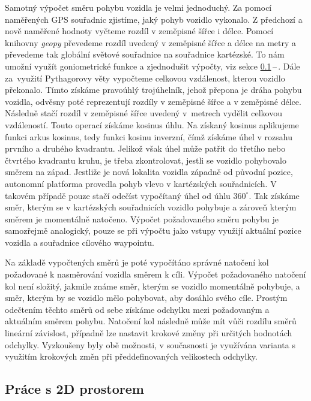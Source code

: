 \documentclass[czech, bachelor]{diploma}
\newcommand{\peteref}[1]{\ref{#1}\,--\,\nameref{#1}}
\begin{document}
Samotný výpočet směru pohybu vozidla je velmi jednoduchý. Za pomocí naměřených GPS souřadnic zjistíme, jaký pohyb vozidlo
vykonalo. Z předchozí a nově naměřené hodnoty vyčteme rozdíl v zeměpisné šířce i délce. Pomocí knihovny \emph{geopy} převedeme
rozdíl uvedený v zeměpisné šířce a délce na metry a převedeme tak globální světové souřadnice na souřadnice kartézské. To nám
umožní využít goniometrické funkce a zjednodušit výpočty, viz sekce \peteref{cartesian-coordinates}. Dále za~využití Pythagorovy
věty vypočteme celkovou vzdálenost, kterou vozidlo překonalo. Tímto získáme pravoúhlý trojúhelník, jehož přepona je dráha
pohybu vozidla, odvěsny poté reprezentují rozdíly v zeměpisné šířce a v zeměpisné délce. Následně stačí rozdíl v zeměpisné šířce
uvedený v~metrech vydělit celkovou vzdáleností. Touto operací získáme kosinus úhlu. Na získaný kosinus aplikujeme funkci arkus
kosinus, tedy funkci kosinu inverzní, čímž získáme úhel v rozsahu prvního a druhého kvadrantu. Jelikož však úhel může patřit do
třetího nebo čtvrtého kvadrantu kruhu, je třeba zkontrolovat, jestli se vozidlo pohybovalo směrem na západ. Jestliže je nová
lokalita vozidla západně od původní pozice, autonomní platforma provedla pohyb vlevo v kartézských souřadnicích. V takovém případě
pouze stačí odečíst vypočítaný úhel od úhlu $360^{\circ}$. Tak získáme směr, kterým se v kartézských souřadnicích vozidlo pohybuje
a zároveň kterým směrem je momentálně natočeno. Výpočet požadovaného směru pohybu je samozřejmě analogický, pouze se při výpočtu
jako vstupy využijí aktuální pozice vozidla a souřadnice cílového waypointu.

Na základě vypočtených směrů je poté vypočítáno správné natočení kol požadované k nasměrování vozidla směrem k cíli. Výpočet
požadovaného natočení kol není složitý, jakmile známe směr, kterým se vozidlo momentálně pohybuje, a směr, kterým by se vozidlo
mělo pohybovat, aby dosáhlo svého cíle. Prostým odečtením těchto směrů od sebe získáme odchylku mezi požadovaným a aktuálním
směrem pohybu. Natočení kol následně může mít vůči rozdílu směrů lineární závislost, případně lze nastavit krokové změny
při určitých hodnotách odchylky. Vyzkoušeny byly obě možnosti, v současnosti je využívána varianta s využitím krokových změn při
předdefinovaných velikostech odchylky.

\subsection{Práce s 2D prostorem} \label{cartesian-coordinates}
\end{document}
